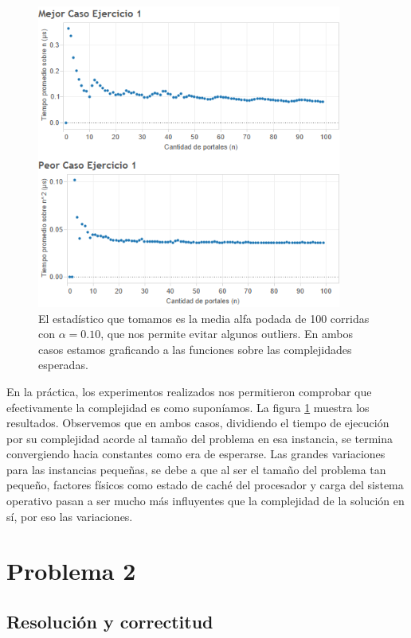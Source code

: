 \documentclass{article}
\theoremstyle{definition}
\theoremstyle{remark}
\begin{document}
\begin{figure}
\centering
\includegraphics[width=10cm]{ex1}
\caption{El estadístico que tomamos es la media alfa podada de 100 corridas con $\alpha = 0.10$, que nos permite evitar algunos outliers. En ambos casos estamos graficando a las funciones sobre las complejidades esperadas. \label{grf:ex1}}
\end{figure}

\pagebreak

En la práctica, los experimentos realizados nos permitieron comprobar que efectivamente la complejidad es como suponíamos. La figura \ref{grf:ex1} muestra los resultados. 
Observemos que en ambos casos, dividiendo el tiempo de ejecución por su complejidad acorde al tamaño del problema en esa instancia, se termina convergiendo hacia constantes como era de esperarse.
Las grandes variaciones para las instancias pequeñas, se debe a que al ser el tamaño del problema tan pequeño, factores físicos como estado de caché del procesador y carga del sistema operativo pasan a ser mucho más influyentes que la complejidad de la solución en sí, por eso las variaciones.

\pagebreak

\section{Problema 2}

\subsection{Resolución y correctitud}
\end{document}
